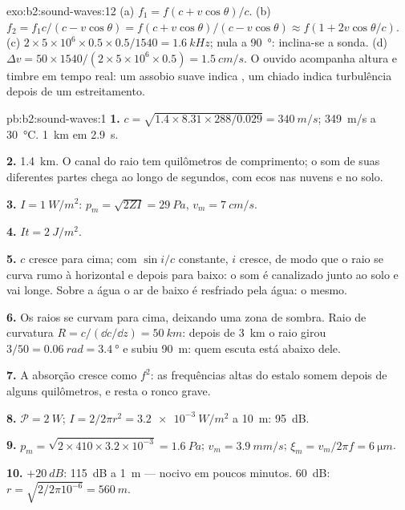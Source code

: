 \begin{solution}{exo:b2:sound-waves:12}
(a) $f_1 = f(c + v\cos\theta)/c$. (b) $f_2 = f_1c/(c - v\cos\theta) = f(c + v\cos\theta)
/(c - v\cos\theta) \approx f(1 + 2v\cos\theta/c)$. (c) $2 \times 5 \times 10^6 \times 0.5 \times 0.5/1540
= \qty{1.6}{kHz}$; nula a \qty{90}{\degree}: inclina-se a sonda. (d) $\Delta v = 50 \times 1540/
(2 \times 5 \times 10^6 \times 0.5) = \qty{1.5}{cm/s}$. O ouvido acompanha altura e timbre em
tempo real: um assobio suave indica , um chiado indica turbulência
depois de um estreitamento.
\end{solution}

\begin{solution}{pb:b2:sound-waves:1}
\textbf{1.} $c = \sqrt{1.4 \times 8.31 \times 288/0.029} = \qty{340}{m/s}$; \qty{349}{m/s}
a \qty{30}{\degreeCelsius}. \qty{1}{km} em \qty{2.9}{s}.

\textbf{2.} \qty{1.4}{km}. O canal do raio tem quilômetros de comprimento; o som de
suas diferentes partes chega ao longo de segundos, com ecos nas nuvens e no
solo.

\textbf{3.} $I = \qty{1}{W/m^2}$: $p_m = \sqrt{2ZI} = \qty{29}{Pa}$, $v_m = \qty{7}{cm/s}$.

\textbf{4.} $It = \qty{2}{J/m^2}$.

\textbf{5.} $c$ cresce para cima; com $\sin i/c$ constante, $i$ cresce, de modo que o
raio se curva rumo à horizontal e depois para baixo: o som é canalizado
junto ao solo e vai longe. Sobre a água o ar de baixo é resfriado
pela água: o mesmo.

\textbf{6.} Os raios se curvam para cima, deixando uma zona de sombra. Raio de
curvatura $R = c/(\dd c/\dd z) = \qty{50}{km}$: depois de \qty{3}{km} o raio girou
$3/50 = \qty{0.06}{rad} = \qty{3.4}{\degree}$ e subiu \qty{90}{m}: quem escuta
está abaixo dele.

\textbf{7.} A absorção cresce como $f^2$: as frequências altas do estalo
somem depois de alguns quilômetros, e resta o ronco grave.

\textbf{8.} $\mathcal P = \qty{2}{W}$; $I = 2/2\pi r^2 = \qty{3.2e-3}{W/m^2}$ a \qty{10}{m}:
\qty{95}{dB}.

\textbf{9.} $p_m = \sqrt{2 \times 410 \times 3.2 \times 10^{-3}} = \qty{1.6}{Pa}$; $v_m = \qty{3.9}{mm/s}$;
$\xi_m = v_m/2\pi f = \qty{6}{\micro m}$.

\textbf{10.} $+\qty{20}{dB}$: \qty{115}{dB} a \qty{1}{m} --- nocivo em poucos
minutos. \qty{60}{dB}: $r = \sqrt{2/2\pi10^{-6}} = \qty{560}{m}$.


\end{solution}
